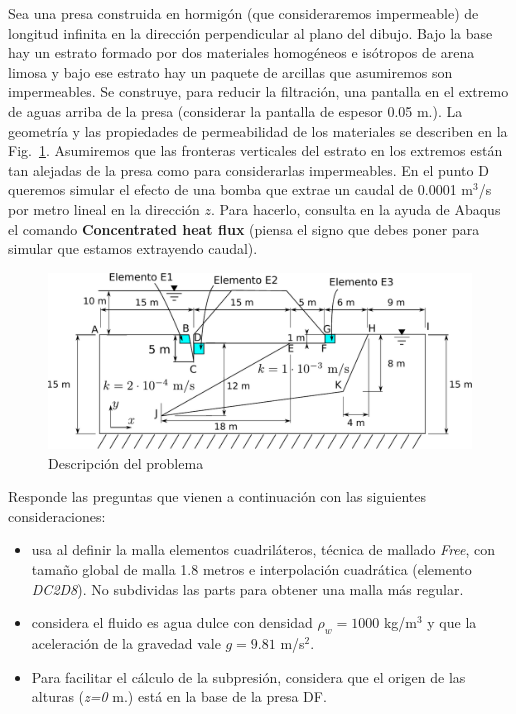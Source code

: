 Sea una presa construida en hormigón (que consideraremos impermeable)
de longitud infinita en la dirección perpendicular al plano del
dibujo. Bajo la base hay un estrato formado por dos materiales
homogéneos e isótropos de arena limosa y bajo ese estrato hay un
paquete de arcillas que asumiremos son impermeables.  Se construye,
para reducir la filtración, una pantalla en el extremo de aguas arriba
de la presa (considerar la pantalla de espesor 0.05 m.).  La geometría
y las propiedades de permeabilidad de los materiales se describen en
la Fig.~\ref{enup01nn}. Asumiremos que las fronteras verticales del
estrato en los extremos están tan alejadas de la presa como para
considerarlas impermeables.  En el punto D queremos simular el efecto
de una bomba que extrae un caudal de 0.0001 m$^3$/s por metro lineal
en la dirección $z$. Para hacerlo, consulta en la ayuda de Abaqus el
comando \textbf{Concentrated heat flux} (piensa el signo que debes
poner para simular que estamos extrayendo caudal).  \vspace{-2mm}
\begin{figure}[!h]
  \centering
  \includegraphics[width=0.99\linewidth]{./body/images/enup01}
  \caption{Descripción del problema}
  \label{enup01nn}
\end{figure}

Responde las preguntas que vienen a continuación con las siguientes
consideraciones:
\begin{itemize}
\item usa al definir la malla elementos cuadriláteros, técnica de
  mallado \textit{Free}, con tamaño global de malla 1.8 metros e
  interpolación cuadrática (elemento \textit{DC2D8}). No subdividas
  las parts para obtener una malla más regular.
\item considera el fluido es agua dulce con densidad $\rho_w=1000$
  kg/m$^3$ y que la aceleración de la gravedad vale $g=9.81$ m/s$^2$.
\item Para facilitar el cálculo de la subpresión, considera que el
  origen de las alturas (\textit{z=0} m.) está en la base de la presa
  DF.
\end{itemize}

